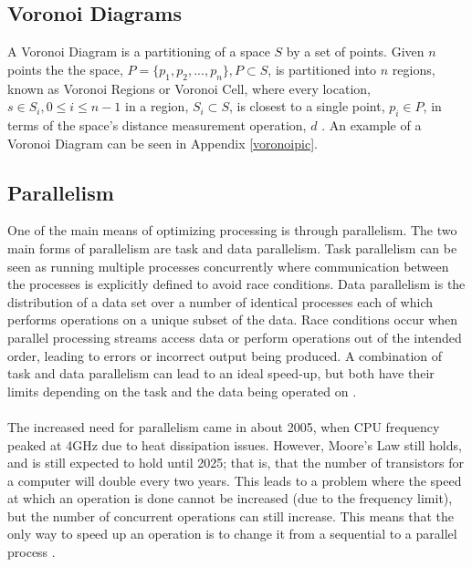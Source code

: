 \subsection{Voronoi Diagrams}\label{tess}
A Voronoi Diagram is a partitioning of a space $S$ by a set of points. Given $n$ points the the space, $P = \{p_1,p_2,...,p_n\}, P \subset S$, is partitioned into $n$ regions, known as Voronoi Regions or Voronoi Cell, where every location, $s \in S_i,0 \leq i \leq n-1$ in a region, $S_i \subset S$, is closest to a single point, $p_i \in P$, in terms of the space's distance measurement operation, $d$ \cite{okabe2009spatial}. An example of a Voronoi Diagram can be seen in Appendix \ref{voronoipic}.
\subsection{Parallelism}\label{parallel}
One of the main means of optimizing processing is through parallelism. The two main forms of parallelism are task and data parallelism. Task parallelism can be seen as running multiple processes concurrently where communication between the processes is explicitly defined to avoid race conditions. Data parallelism is the distribution of a data set over a number of identical processes each of which performs operations on a unique subset of the data. Race conditions occur when parallel processing streams access data or perform operations out of the intended order, leading to errors or incorrect output being produced. A combination of task and data parallelism can lead to an ideal speed-up, but both have their limits depending on the task and the data being operated on \cite{subhlok1993exploiting}.
\\
\\
The increased need for parallelism came in about 2005, when CPU frequency peaked at 4GHz due to heat dissipation issues. However, Moore's Law still holds, and is still expected to hold until 2025; that is, that the number of transistors for a computer will double every two years. This leads to a problem where the speed at which an operation is done cannot be increased (due to the frequency limit), but the number of concurrent operations can still increase. This means that the only way to speed up an operation is to change it from a sequential to a parallel process \cite{rajan2013informatics}.
